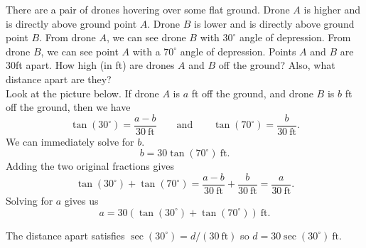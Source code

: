 There are a pair of drones hovering over some flat ground. Drone $A$ is higher and is directly above ground point $A$. Drone $B$ is lower and is directly above ground point $B$. From drone $A$, we can see drone $B$ with $30^{\circ}$ angle of depression. From drone $B$, we can see point $A$ with a $70^{\circ}$ angle of depression. Points $A$ and $B$ are $30$ft apart. How high (in ft) are drones $A$ and $B$ off the ground? Also, what distance apart are they?
\[\]
Look at the picture below. If drone $A$ is $a$ ft off the ground, and drone $B$ is $b$ ft off the ground, then we have
\[
  \tan(30^{\circ}) = \frac{a - b}{30\ \text{ft}} \qquad \text{and} \qquad \tan(70^{\circ}) = \frac{b}{30\ \text{ft}}.
\]
We can immediately solve for $b$.
\[
  b = 30\tan(70^{\circ})\ \text{ft}.
\]
Adding the two original fractions gives
\[
  \tan(30^{\circ}) + \tan(70^{\circ}) = \frac{a - b}{30\ \text{ft}} + \frac{b}{30\ \text{ft}} = \frac{a}{30\ \text{ft}}.
\]
Solving for $a$ gives us
\[
  a = 30(\tan(30^{\circ}) + \tan(70^{\circ}))\ \text{ft}.
\]

The distance apart satisfies $\sec(30^{\circ}) = d / (30\ \text{ft})$ so $d = 30\sec(30^{\circ})\ \text{ft}$.
